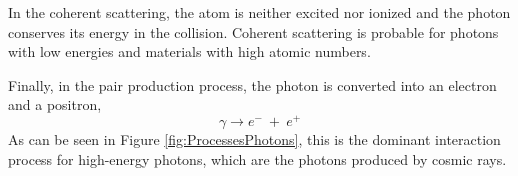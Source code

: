 In the coherent scattering, the atom is neither excited nor ionized and the photon conserves its energy in the collision. Coherent scattering is probable for photons with low energies and materials with high atomic numbers. %

Finally, in the pair production process, the photon is converted into an electron and a positron,
\begin{equation}
\gamma \longrightarrow e^- ~ + ~ e^+
\label{eq:pairproductionprocess}
\end{equation}
As can be seen in Figure \ref{fig:ProcessesPhotons}, this is the dominant interaction process for high-energy photons, which are the photons produced by cosmic rays.


